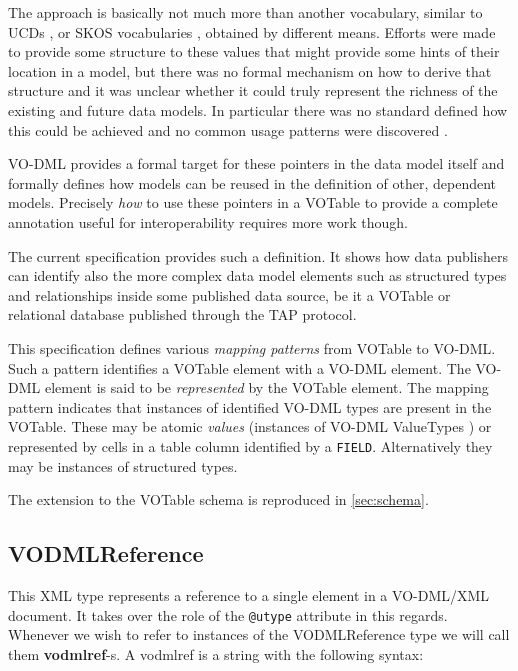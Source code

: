 \documentclass[11pt,a4paper]{ivoa}
\begin{document}
The approach is basically not much more than another vocabulary, similar
to UCDs \cite{2018ivoa.spec.0527M}, or SKOS vocabularies \cite{2009ivoa.spec.1007G}, obtained by
different means. Efforts were made to provide some structure to these
values that might provide some hints of their location in a model, but
there was no formal mechanism on how to derive that structure and it was
unclear whether it could truly represent the richness of the existing
and future data models. In particular there was no standard defined how
this could be achieved and no common usage patterns were discovered
\cite{note:utypeusage}.

VO-DML provides a formal target for these pointers in the data model
itself and formally defines how models can be reused in the definition
of other, dependent models. Precisely \emph{how} to use these pointers
in a VOTable to provide a complete annotation useful for
interoperability requires more work though.

The current specification provides such a definition. It shows how data
publishers can identify also the more complex data model elements such
as structured types and relationships inside some published data source,
be it a VOTable or relational database published through the TAP
protocol.

This specification defines various \emph{mapping patterns} from VOTable
to VO-DML. Such a pattern identifies a VOTable element with a VO-DML
element. The VO-DML element is said to be \emph{represented} by the
VOTable element. The mapping pattern indicates that instances of
identified VO-DML types are present in the VOTable. These may be atomic
\emph{values} (instances of VO-DML ValueTypes \cite{2018ivoa.spec.0910L}) or
represented by cells in a table column identified by a \texttt{FIELD}.
Alternatively they may be instances of structured types.

The extension to the VOTable schema is reproduced in \ref{sec:schema}.

\subsection{VODMLReference}\label{vodmlreference}

This XML type represents a reference to a single element in a VO-DML/XML
document. It takes over the role of the \texttt{@utype} attribute in this
regards. Whenever we wish to refer to instances of the VODMLReference
type we will call them \textbf{vodmlref}-s. A vodmlref is a string with
the following syntax:
\end{document}
